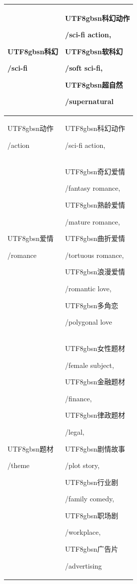 \begin{table}[h]
\begin{tabularx}{\linewidth}{l|X}
    \begin{CJK*}{UTF8}{gbsn}科幻\end{CJK*}/sci-fi & \begin{CJK*}{UTF8}{gbsn}科幻动作\end{CJK*}/sci-fi action, \begin{CJK*}{UTF8}{gbsn}软科幻\end{CJK*}/soft sci-fi, \begin{CJK*}{UTF8}{gbsn}超自然\end{CJK*}/supernatural \\
    \midrule
    \begin{CJK*}{UTF8}{gbsn}动作\end{CJK*}/action & \begin{CJK*}{UTF8}{gbsn}科幻动作\end{CJK*}/sci-fi action, \\
    \midrule
    \begin{CJK*}{UTF8}{gbsn}爱情\end{CJK*}/romance & \begin{CJK*}{UTF8}{gbsn}奇幻爱情\end{CJK*}/fantasy romance, \begin{CJK*}{UTF8}{gbsn}熟龄爱情\end{CJK*}/mature romance, \begin{CJK*}{UTF8}{gbsn}曲折爱情\end{CJK*}/tortuous romance, \begin{CJK*}{UTF8}{gbsn}浪漫爱情\end{CJK*}/romantic love, \begin{CJK*}{UTF8}{gbsn}多角恋\end{CJK*}/polygonal love \\
    \midrule
    \begin{CJK*}{UTF8}{gbsn}题材\end{CJK*}/theme & \begin{CJK*}{UTF8}{gbsn}女性题材\end{CJK*}/female subject, \begin{CJK*}{UTF8}{gbsn}金融题材\end{CJK*}/finance, \begin{CJK*}{UTF8}{gbsn}律政题材\end{CJK*}/legal, \begin{CJK*}{UTF8}{gbsn}剧情故事\end{CJK*}/plot story, \begin{CJK*}{UTF8}{gbsn}行业剧\end{CJK*}/family comedy, \begin{CJK*}{UTF8}{gbsn}职场剧\end{CJK*}/workplace, \begin{CJK*}{UTF8}{gbsn}广告片\end{CJK*}/advertising \\

\end{tabularx}
\end{table}
